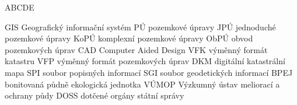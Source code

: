 
\begin{seznamzkratek}{ABCDE}

	      {GIS}
	      {Geografický informační systém}
	      {PÚ}
	      {pozemkové úpravy}
	      {JPÚ}
	      {jednoduché pozemkové úpravy}
	      {KoPÚ}
	      {komplexní pozemkové úpravy}
	      {ObPÚ}
	      {obvod pozemkových úprav}
	      {CAD}
	      {Computer Aided Design}
	      {VFK}
	      {výměnný formát katastru}
	      {VFP}
	      {výměnný formát pozemkových úprav}
	      {DKM}
	      {digitální katastrální mapa}
	      {SPI}
	      {soubor popisných informací}
	      {SGI}
	      {soubor geodetických informací}
	      {BPEJ}
	      {bonitovaná půdně ekologická jednotka}
	      {VÚMOP}
	      {Výzkumný ústav meliorací a ochrany půdy}
	      {DOSS}
	      {dotčené orgány státní správy}
	      
\end{seznamzkratek}